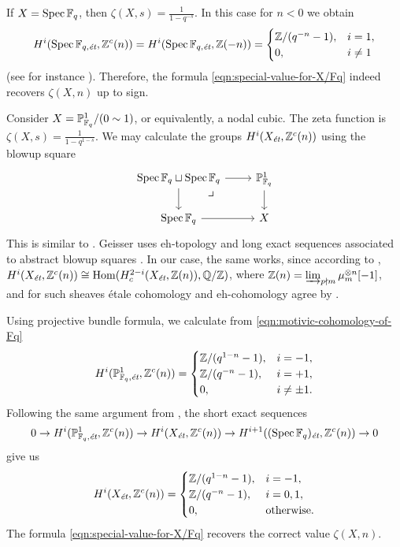 \documentclass{article}
\numberwithin{equation}{section}
\begin{document}
\begin{example}
  If $X = \Spec \FF_q$, then $\zeta (X,s) = \frac{1}{1 - q^{-s}}$. In this case
  for $n < 0$ we obtain
  \begin{equation}
    \label{eqn:motivic-cohomology-of-Fq}
    H^i (\Spec \FF_{q,\et}, \ZZ^c (n)) = H^i (\Spec \FF_{q,\et}, \ZZ (-n)) =
    \begin{cases}
      \ZZ/(q^{-n} - 1), & i = 1, \\
      0, & i \ne 1
    \end{cases}
  \end{equation}
  (see for instance \cite[Example~4.2]{Geisser-2017}).
  Therefore, the formula \eqref{eqn:special-value-for-X/Fq} indeed recovers
  $\zeta (X,n)$ up to sign.
\end{example}

\begin{example}
  Consider $X = \PP^1_{\FF_q}/(0\sim 1)$, or equivalently, a nodal cubic.
  The zeta function is $\zeta (X,s) = \frac{1}{1 - q^{1-s}}$.  We may calculate
  the groups $H^i (X_\et, \ZZ^c (n))$ using the blowup square
  \[ \begin{tikzcd}
      \Spec \FF_q \sqcup \Spec \FF_q \ar{r}\ar{d}\tikzpb & \PP^1_{\FF_q} \ar{d} \\
      \Spec \FF_q \ar{r} & X
    \end{tikzcd} \]
  This is similar to \cite[\S 8, Example~2]{Geisser-2006}. Geisser uses
  eh-topology and long exact sequences associated to abstract blowup squares
  \cite[Proposition~3.2]{Geisser-2006}. In our case, the same works, since
  according to \cite[Theorem~I]{Beshenov-Weil-etale-1},
  $H^i (X_\et, \ZZ^c (n)) \cong \Hom (H^{2-i}_c (X_\et, \ZZ (n)),\QQ/\ZZ)$,
  where $\ZZ (n) = \varinjlim_{p\nmid m} \mu_m^{\otimes n} [-1]$, and
  for such sheaves étale cohomology and eh-cohomology agree by
  \cite[Theorem~3.6]{Geisser-2006}.

  Using projective bundle formula, we calculate from
  \eqref{eqn:motivic-cohomology-of-Fq}
  \[ H^i (\PP^1_{\FF_q,\et}, \ZZ^c (n)) = \begin{cases}
      \ZZ/(q^{1-n} - 1), & i = -1, \\
      \ZZ/(q^{-n} - 1), & i = +1, \\
      0, & i \ne \pm 1.
    \end{cases} \]
  Following the same argument from \cite[\S 8, Example~2]{Geisser-2006},
  the short exact sequences
  \[ 0 \to H^i (\PP^1_{\FF_q,\et}, \ZZ^c (n)) \to
    H^i (X_\et, \ZZ^c (n)) \to
    H^{i+1} ((\Spec \FF_q)_\et, \ZZ^c (n)) \to 0 \]
  give us
  \[ H^i (X_\et, \ZZ^c (n)) = \begin{cases}
      \ZZ/(q^{1-n} - 1), & i = -1, \\
      \ZZ/(q^{-n} - 1), & i = 0,1, \\
      0, & \text{otherwise}.
    \end{cases} \]
  The formula \eqref{eqn:special-value-for-X/Fq} recovers the correct value
  $\zeta (X,n)$.
\end{example}
\end{document}
